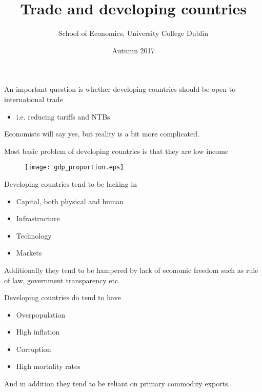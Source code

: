\documentclass{beamer}
\title{Trade and developing countries}
\author{School of Economics, University College Dublin}
\date{Autumn 2017}
\begin{document}
\begin{frame}
\titlepage  
\end{frame}

\begin{frame}
 An important question is whether developing countries should be open to international trade
 \begin{itemize}
   \item i.e. reducing tariffs and NTBs
 \end{itemize}
 \medskip
 Economists will say yes, but reality is a bit more complicated.
\end{frame}

\begin{frame}
 Most basic problem of developing countries is that they are low income
 \begin{figure}
   \texttt{[image: gdp\_proportion.eps]}
 \end{figure}
\end{frame}

\begin{frame}
  Developing countries tend to be lacking in
  \begin{itemize}
    \item Capital, both physical and human
    \item Infrastructure
    \item Technology
    \item Markets
  \end{itemize}
  \medskip
  Additionally they tend to be hampered by lack of economic freedom such as rule of law, government transparency etc. 
\end{frame}

\begin{frame}
 Developing countries do tend to have
 \begin{itemize}
   \item Overpopulation
   \item High inflation
   \item Corruption
   \item High mortality rates
 \end{itemize}
 And in addition they tend to be reliant on primary commodity exports. 
\end{frame}
\end{document}
